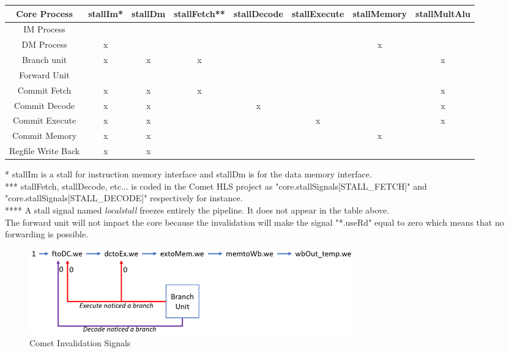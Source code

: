\documentclass[10pt,letterpaper]{article}
\begin{document}
\begin{center}
 \begin{tabular}{||c c c c c c c c||} 
 \hline
 Core Process & stallIm* & stallDm & stallFetch** & stallDecode & stallExecute & stallMemory & stallMultAlu \\ [0.5ex] 
 \hline\hline
IM Process &  &  &  &  &  &  &  \\ 
 \hline
DM Process & x &  &  &  &  & x & \\
\hline
Branch unit & x & x & x &  &  &  & x \\
\hline
Forward Unit &  &  &  &  &  &  & \\
\hline
Commit Fetch & x & x & x &  &  &  & x \\
\hline
Commit Decode & x & x &  & x &  &  & x \\
\hline
Commit Execute & x & x &  &  & x &  & x \\
\hline
Commit Memory & x & x &  &  &  & x &  \\
\hline
Regfile Write Back & x & x &  &  &  &  & \\
 \hline
\end{tabular}
\end{center}
* stallIm is a stall for instruction memory interface and stallDm is for the data memory interface.\\
*** stallFetch, stallDecode, etc... is coded in the Comet HLS project as "core.stallSignals[STALL\_FETCH]" and "core.stallSignals[STALL\_DECODE]" respectively for instance.\\
**** A stall signal named \textit{localstall} freezes entirely the pipeline. It does not appear in the table above.\\

The forward unit will not impact the core because the invalidation will make the signal "*.useRd" equal to zero which means that no forwarding is possible.

\begin{figure}[H]
\centering
\includegraphics[width=14cm]{img/invalidation_comet.PNG}
\caption{Comet Invalidation Signals}
\label{fig:cache_invalidation}
\end{figure}
\end{document}

